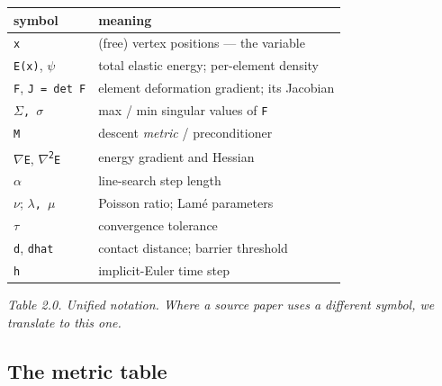 \documentclass{egpubl}
\begin{document}
\begin{table}[t]\centering\footnotesize\begin{tabular}{ll}
\toprule symbol & meaning \\ \midrule
\texttt{x} & (free) vertex positions --- the variable \\
\texttt{E(x)}, \texttt{$\psi$} & total elastic energy; per-element density \\
\texttt{F}, \texttt{J = det F} & element deformation gradient; its Jacobian \\
\texttt{$\Sigma$, $\sigma$} & max / min singular values of \texttt{F} \\
\texttt{M} & descent \emph{metric} / preconditioner \\
\texttt{$\nabla$E}, \texttt{$\nabla$\textsuperscript{2}E} & energy gradient and Hessian \\
\texttt{$\alpha$} & line-search step length \\
\texttt{$\nu$}; \texttt{$\lambda$, $\mu$} & Poisson ratio; Lam\'{e} parameters \\
\texttt{$\tau$} & convergence tolerance \\
\texttt{d}, \texttt{dhat} & contact distance; barrier threshold \\
\texttt{h} & implicit-Euler time step \\
\bottomrule\end{tabular}\end{table}

\emph{Table 2.0. Unified notation. Where a source paper uses a different symbol, we translate to this one.}

\subsection{The metric table}
\end{document}
